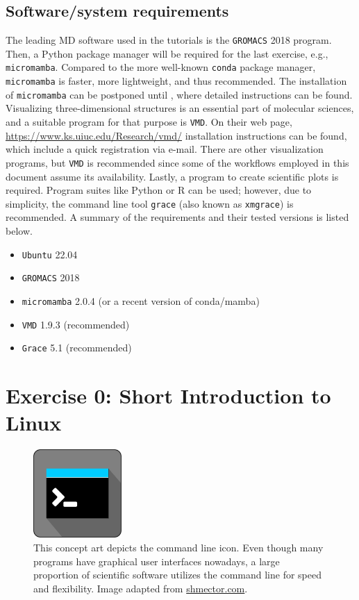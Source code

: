\documentclass[9pt,tutorial]{livecoms}
\begin{document}
\subsection{Software/system requirements}
The leading MD software used in the tutorials is the \texttt{GROMACS} 2018 program. Then, a Python package manager will be required for the last exercise, e.g., \texttt{micromamba}. Compared to the more well-known \texttt{conda} package manager, \texttt{micromamba} is faster, more lightweight, and thus recommended. The installation of \texttt{micromamba} can be postponed until , where detailed instructions can be found. Visualizing three-dimensional structures is an essential part of molecular sciences, and a suitable program for that purpose is \texttt{VMD}. On their web page, \url{https://www.ks.uiuc.edu/Research/vmd/} installation instructions can be found, which include a quick registration via e-mail. There are other visualization programs, but \texttt{VMD} is recommended since some of the workflows employed in this document assume its availability. Lastly, a program to create scientific plots is required. Program suites like Python or R can be used; however, due to simplicity, the command line tool \texttt{grace} (also known as \texttt{xmgrace}) is recommended. A summary of the requirements and their tested versions is listed below.
\begin{itemize}
    \item \texttt{Ubuntu} 22.04
    \item \texttt{GROMACS} 2018
    \item \texttt{micromamba} 2.0.4 (or a recent version of conda/mamba)
    \item \texttt{VMD} 1.9.3 (recommended)
    \item \texttt{Grace} 5.1 (recommended)
\end{itemize}

\newpage

\section{Exercise 0: Short Introduction to Linux}\label{sec:linuxTut}
\begin{figure}[H]
    \centering
    \includegraphics[width=0.3\textwidth]{figures/command-line-icon.pdf}
    \caption{This concept art depicts the command line icon. Even though many programs have graphical user interfaces nowadays, a large proportion of scientific software utilizes the command line for speed and flexibility. Image adapted from \url{shmector.com}.}
    \label{fig:Commandline-icon}
\end{figure}
\end{document}
